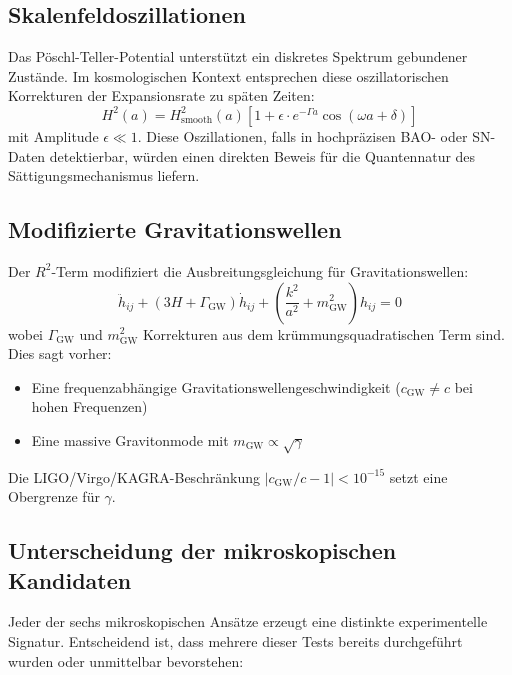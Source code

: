 \documentclass[11pt,a4paper]{article}
\begin{document}
\subsection{Skalenfeldoszillationen}

Das P\"oschl-Teller-Potential unterst\"utzt ein diskretes Spektrum gebundener Zust\"ande. Im kosmologischen Kontext entsprechen diese oszillatorischen Korrekturen der Expansionsrate zu sp\"aten Zeiten:
\begin{equation}
H^2(a) = H^2_{\mathrm{smooth}}(a) \left[1 + \epsilon \cdot e^{-\Gamma a} \cos(\omega a + \delta)\right]
\end{equation}
mit Amplitude $\epsilon \ll 1$. Diese Oszillationen, falls in hochpr\"azisen BAO- oder SN-Daten detektierbar, w\"urden einen direkten Beweis f\"ur die Quantennatur des S\"attigungsmechanismus liefern.

\subsection{Modifizierte Gravitationswellen}

Der $R^2$-Term modifiziert die Ausbreitungsgleichung f\"ur Gravitationswellen:
\begin{equation}
\ddot{h}_{ij} + (3H + \Gamma_{\mathrm{GW}})\dot{h}_{ij} + \left(\frac{k^2}{a^2} + m_{\mathrm{GW}}^2\right) h_{ij} = 0
\end{equation}
wobei $\Gamma_{\mathrm{GW}}$ und $m_{\mathrm{GW}}^2$ Korrekturen aus dem kr\"ummungsquadratischen Term sind. Dies sagt vorher:
\begin{itemize}
\item Eine frequenzabh\"angige Gravitationswellengeschwindigkeit ($c_{\mathrm{GW}} \neq c$ bei hohen Frequenzen)
\item Eine massive Gravitonmode mit $m_{\mathrm{GW}} \propto \sqrt{\gamma}$
\end{itemize}
Die LIGO/Virgo/KAGRA-Beschr\"ankung $|c_{\mathrm{GW}}/c - 1| < 10^{-15}$ \cite{Abbott2017} setzt eine Obergrenze f\"ur $\gamma$.

\subsection{Unterscheidung der mikroskopischen Kandidaten}

Jeder der sechs mikroskopischen Ans\"atze erzeugt eine distinkte experimentelle Signatur. Entscheidend ist, dass mehrere dieser Tests bereits durchgef\"uhrt wurden oder unmittelbar bevorstehen:
\end{document}
